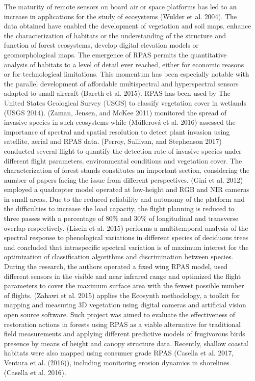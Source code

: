 \documentclass[]{interact}
\theoremstyle{plain}%
\theoremstyle{definition}
\theoremstyle{remark}
\begin{document}
The maturity of remote sensors on board air or space platforms has led
to an increase in applications for the study of ecosystems (Wulder et
al. 2004). The data obtained have enabled the development of vegetation
and soil maps, enhance the characterization of habitats or the
understanding of the structure and function of forest ecosystems,
develop digital elevation models or geomorphological maps. The emergence
of RPAS permits the quantitative analysis of habitats to a level of
detail ever reached, either for economic reasons or for technological
limitations. This momentum has been especially notable with the parallel
development of affordable multispectral and hyperspectral sensors
adapted to small aircraft (Bareth et al. 2015). RPAS has been used by
The United States Geological Survey (USGS) to classify vegetation cover
in wetlands (USGS 2014). (Zaman, Jensen, and McKee 2011) monitored the
spread of invasive species in such ecosystems while (Müllerová et al.
2016) assessed the importance of spectral and spatial resolution to
detect plant invasion using satellite, aerial and RPAS data. (Perroy,
Sullivan, and Stephenson 2017) conducted several flight to quantify the
detection rate of invasive species under different flight parameters,
environmental conditions and vegetation cover. The characterization of
forest stands constitutes an important section, considering the number
of papers facing the issue from different perspectives. (Gini et al.
2012) employed a quadcopter model operated at low-height and RGB and NIR
cameras in small areas. Due to the reduced reliability and autonomy of
the platform and the difficulties to increase the load capacity, the
flight planning is reduced to three passes with a percentage of 80\% and
30\% of longitudinal and transverse overlap respectively. (Lisein et al.
2015) performs a multitemporal analysis of the spectral response to
phenological variations in different species of deciduous trees and
concluded that intraspecific spectral variation is of maximum interest
for the optimization of classification algorithms and discrimination
between species. During the research, the authors operated a fixed wing
RPAS model, used different sensors in the visible and near infrared
range and optimized the flight parameters to cover the maximum surface
area with the fewest possible number of flights. (Zahawi et al. 2015)
applies the Ecosynth methodology, a toolkit for mapping and measuring 3D
vegetation using digital cameras and artificial vision open source
software. Such project was aimed to evaluate the effectiveness of
restoration actions in forests using RPAS as a viable alternative for
traditional field measurements and applying different predictive models
of frugivorous birds presence by means of height and canopy structure
data. Recently, shallow coastal habitats were also mapped using consumer
grade RPAS (Casella et al. 2017, Ventura et al. (2016)), including
monitoring erosion dynamics in shorelines. (Casella et al. 2016).
\end{document}
